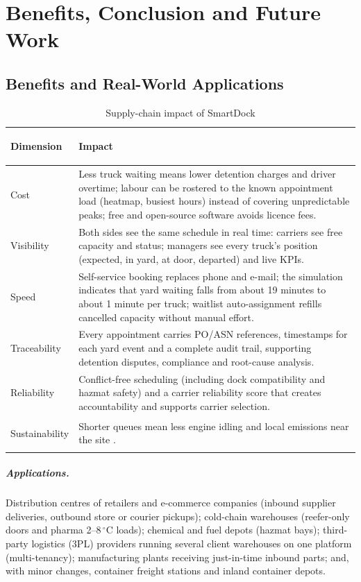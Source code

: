 \chapter{Benefits, Conclusion and Future Work}

\section{Benefits and Real-World Applications}
\begin{table}[H]
\centering
\small
\caption{Supply-chain impact of SmartDock}
\label{tab:benefits}
\begin{tabularx}{\textwidth}{>{\bfseries\raggedright\arraybackslash}p{2.6cm}X}
\toprule
Dimension & Impact \\
\midrule
Cost & Less truck waiting means lower detention charges and driver overtime; labour can be rostered to the known appointment load (heatmap, busiest hours) instead of covering unpredictable peaks; free and open-source software avoids licence fees. \\
Visibility & Both sides see the same schedule in real time: carriers see free capacity and status; managers see every truck's position (expected, in yard, at door, departed) and live KPIs. \\
Speed & Self-service booking replaces phone and e-mail; the simulation indicates that yard waiting falls from about 19 minutes to about 1 minute per truck; waitlist auto-assignment refills cancelled capacity without manual effort. \\
Traceability & Every appointment carries PO/ASN references, timestamps for each yard event and a complete audit trail, supporting detention disputes, compliance and root-cause analysis. \\
Reliability & Conflict-free scheduling (including dock compatibility and hazmat safety) and a carrier reliability score that creates accountability and supports carrier selection. \\
Sustainability & Shorter queues mean less engine idling and local emissions near the site \cite{giuliano2007}. \\
\bottomrule
\end{tabularx}
\end{table}

\paragraph{Applications.} Distribution centres of retailers and e-commerce companies (inbound supplier deliveries, outbound store or courier pickups); cold-chain warehouses (reefer-only doors and pharma 2--8\,$^{\circ}$C loads); chemical and fuel depots (hazmat bays); third-party logistics (3PL) providers running several client warehouses on one platform (multi-tenancy); manufacturing plants receiving just-in-time inbound parts; and, with minor changes, container freight stations and inland container depots.

